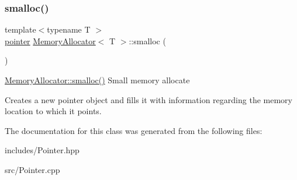 \subsubsection{\texorpdfstring{smalloc()}{smalloc()}\hspace{0.1cm}{\footnotesize\ttfamily [2/2]}}
{\footnotesize\ttfamily template$<$typename T $>$ \\
\hyperlink{structpointer}{pointer} \hyperlink{class_memory_allocator}{Memory\+Allocator}$<$ T $>$\+::smalloc (\begin{DoxyParamCaption}{ }\end{DoxyParamCaption})}

\hyperlink{class_memory_allocator_a8712abdd481153bf70734258bfc3f8b9}{Memory\+Allocator\+::smalloc()} Small memory allocate

Creates a new pointer object and fills it with information regarding the memory location to which it points. 

The documentation for this class was generated from the following files\+:\begin{DoxyCompactItemize}
\item 
includes/Pointer.\+hpp\item 
src/Pointer.\+cpp\end{DoxyCompactItemize}
